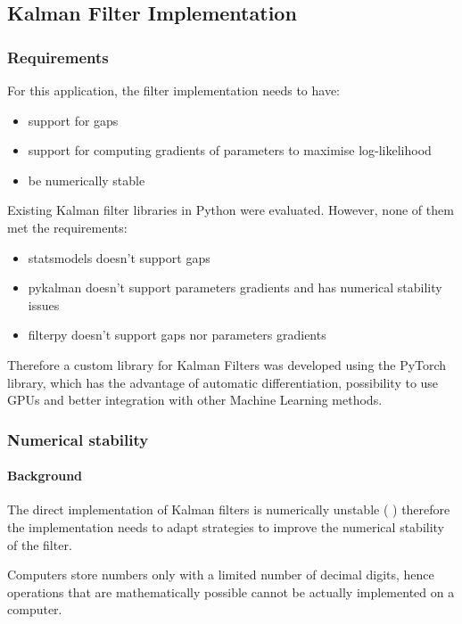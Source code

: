 \documentclass{article}
\let\Oldsubsection\subsection
\renewcommand{\subsection}{\FloatBarrier\Oldsubsection}
\let\Oldsubsubsection\subsubsection
\renewcommand{\subsubsection}{\FloatBarrier\Oldsubsubsection}
\begin{document}
\subsection{Kalman Filter Implementation}

\subsubsection{Requirements}

For this application, the filter implementation needs to have:

\begin{itemize}
    \item support for gaps
    \item support for computing gradients of parameters to maximise log-likelihood
    \item be numerically stable
\end{itemize}

Existing Kalman filter libraries in Python were evaluated. However, none of them met the requirements:
\begin{itemize}
    \item statsmodels doesn't support gaps
    \item pykalman doesn't support parameters gradients and has numerical stability issues
    \item filterpy doesn't support gaps nor parameters gradients 
\end{itemize}
Therefore a custom library for Kalman Filters was developed using the PyTorch library, which has the advantage of automatic differentiation, possibility to use GPUs and better integration with other Machine Learning methods.

\subsubsection{Numerical stability}

\paragraph{Background}
The direct implementation of Kalman filters is numerically unstable (\cite{mohinder_s_grewal_kalman_2001} \cite{dan_simon_optimal_2006}) therefore the implementation needs to adapt strategies to improve the numerical stability of the filter.

Computers store numbers only with a limited number of decimal digits, hence operations that are mathematically possible cannot be actually implemented on a computer.
\end{document}
